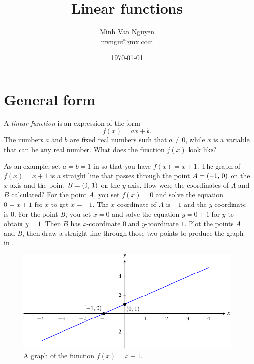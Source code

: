 \documentclass[a4paper,oneside,12pt]{article}
\begin{document}
\title{\Large\bf Linear functions}
\author{%
  Minh Van Nguyen \\
  \url{mvngu@gmx.com}
}
\date{\today}
\maketitle



\section{General form}
\label{sec:general_form}

A \emph{linear function} is an expression of the form
\begin{equation}
\label{eqn:linear_function_general}
f(x)
=
ax + b.
\end{equation}
The numbers $a$ and $b$ are fixed real numbers such that $a \neq 0$,
while $x$ is a variable that can be any real number.  What does the
function $f(x)$ look like?

As an example, set $a = b = 1$ in
 so that you have
$f(x) = x + 1$.  The graph of $f(x) = x + 1$ is a straight line that
passes through the point $A = \left\lparen{-1},\, {0}\right\rparen$ on the $x$-axis and the
point $B = \left\lparen{0},\, {1}\right\rparen$ on the $y$-axis.  How were the coordinates of
$A$ and $B$ calculated?  For the point $A$, you set $f(x) = 0$ and
solve the equation $0 = x + 1$ for $x$ to get $x = -1$.  The
$x$-coordinate of $A$ is $-1$ and the $y$-coordinate is $0$.  For the
point $B$, you set $x = 0$ and solve the equation $y = 0 + 1$ for $y$
to obtain $y = 1$.  Then $B$ has $x$-coordinate $0$ and $y$-coordinate
$1$.  Plot the points $A$ and $B$, then draw a straight line through
those two points to produce the graph in .

\begin{figure}[!htbp]
\centering
\includegraphics[scale=1]{image/06/a-1-b-1.pdf}
\caption{%
  A graph of the function $f(x) = x + 1$.
}
\label{fig:plot_x_+_1}
\end{figure}
\end{document}
